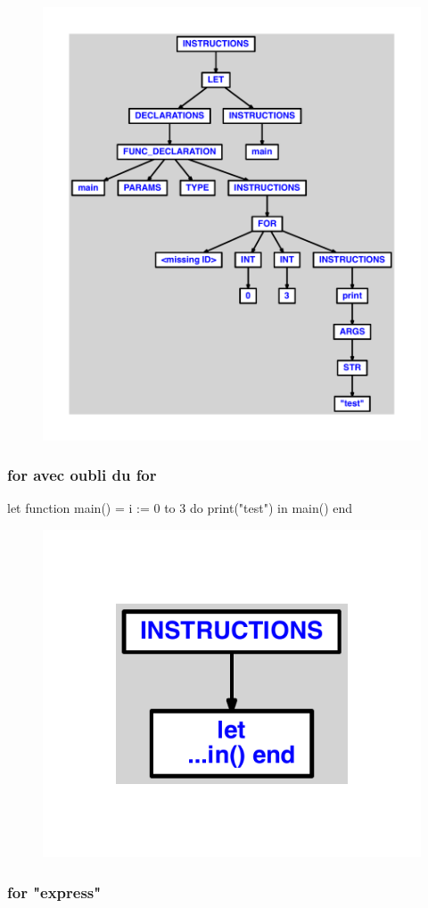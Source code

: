 \documentclass{article}
\begin{document}
\begin{figure}[H]\centering\includegraphics[max width=\textwidth]{ast/ast_185.pdf}\end{figure}\subsubsection{for avec oubli du for}
\begin{verbatimtab}
let
	function main() =
		i := 0 to 3 do
			print("test")
in main() end
\end{verbatimtab}
\begin{figure}[H]\centering\includegraphics[max width=\textwidth]{ast/ast_186.pdf}\end{figure}\subsubsection{for "express"}
\end{document}
